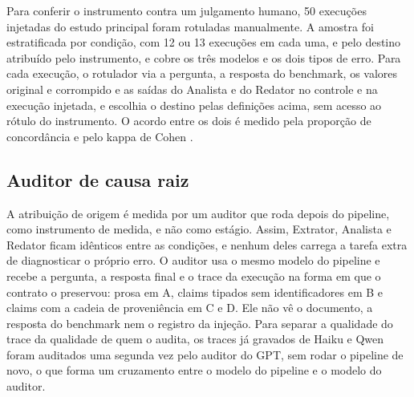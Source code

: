 Para conferir o instrumento contra um julgamento humano, 50 execuções injetadas do estudo principal foram rotuladas manualmente.
A amostra foi estratificada por condição, com 12 ou 13 execuções em cada uma, e pelo destino atribuído pelo instrumento, e cobre os três modelos e os dois tipos de erro.
Para cada execução, o rotulador via a pergunta, a resposta do benchmark, os valores original e corrompido e as saídas do Analista e do Redator no controle e na execução injetada, e escolhia o destino pelas definições acima, sem acesso ao rótulo do instrumento.
O acordo entre os dois é medido pela proporção de concordância e pelo kappa de Cohen \cite{cohen1960coefficient}.

\subsection{Auditor de causa raiz}\label{sec:auditor}

A atribuição de origem é medida por um auditor que roda depois do pipeline, como instrumento de medida, e não como estágio.
Assim, Extrator, Analista e Redator ficam idênticos entre as condições, e nenhum deles carrega a tarefa extra de diagnosticar o próprio erro.
O auditor usa o mesmo modelo do pipeline e recebe a pergunta, a resposta final e o trace da execução na forma em que o contrato o preservou: prosa em A, claims tipados sem identificadores em B e claims com a cadeia de proveniência em C e D.
Ele não vê o documento, a resposta do benchmark nem o registro da injeção.
Para separar a qualidade do trace da qualidade de quem o audita, os traces já gravados de Haiku e Qwen foram auditados uma segunda vez pelo auditor do GPT, sem rodar o pipeline de novo, o que forma um cruzamento entre o modelo do pipeline e o modelo do auditor.

